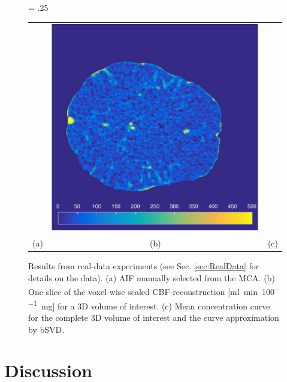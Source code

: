 \documentclass[journal,twocolumn]{IEEEtran}
\newlength{\fwd}
\begin{document}
	\begin{figure}[h!tb]\label{fig:RealData}
		\fwd = .25\textwidth
		\centering
		\begin{tabular}{ccc}
		 {\small} & \includegraphics[width = \fwd]{./figs/real_axial160.pdf} & {\small} \\
		 (a) & (b) & (c) 
		\end{tabular}
		\caption{Results from real-data experiments (see Sec. \ref{sec:RealData} for details on the data). (a) AIF manually selected from the MCA. (b) One slice of the voxel-wise scaled CBF-reconstruction [\si{\milli\litre\per\minute\per100\milli\gram}] for a 3D volume of interest. (c) Mean concentration curve for the complete 3D volume of interest and the curve approximation by bSVD.}
	\end{figure}


	
	
	\section{Discussion}\label{sec:conclusion}
\end{document}
